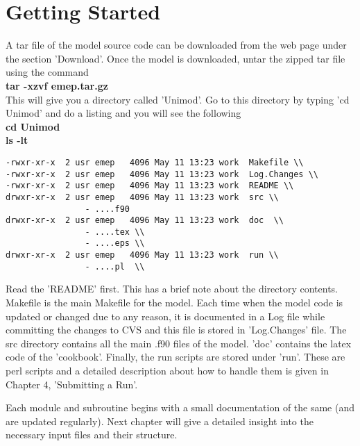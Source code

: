 \section{Getting Started}

A tar file of the model source code can be downloaded from the web
page under the section 'Download'.   Once the model is downloaded,
untar the zipped tar file using  the command \\

\textbf{tar -xzvf emep.tar.gz} \\

This will give you a directory called 'Unimod'.  Go to this directory
by typing 'cd Unimod' and do a listing and you will see the following
\\

\textbf{cd Unimod} \\
          \textbf{ls -lt}


\begin{verbatim}
-rwxr-xr-x  2 usr emep   4096 May 11 13:23 work  Makefile \\
-rwxr-xr-x  2 usr emep   4096 May 11 13:23 work  Log.Changes \\
-rwxr-xr-x  2 usr emep   4096 May 11 13:23 work  README \\
drwxr-xr-x  2 usr emep   4096 May 11 13:23 work  src \\
                - ....f90
drwxr-xr-x  2 usr emep   4096 May 11 13:23 work  doc  \\
                - ....tex \\
                - ....eps \\
drwxr-xr-x  2 usr emep   4096 May 11 13:23 work  run \\
                - ....pl  \\

\end{verbatim}

Read the 'README' first.  This has a brief note about the directory
contents.  Makefile is the main Makefile for the model.  Each time
when the model code is updated or changed due to any reason, it is
documented in a Log file while committing the changes to CVS and this
file is stored in 'Log.Changes' file.  The src directory contains all
the main .f90 files of the model. 'doc' contains the latex code of the
'cookbook'.  Finally, the run scripts are stored under 'run'.  These
are perl scripts and a detailed description about how to handle them
is given in Chapter 4, 'Submitting a Run'.  

Each module and subroutine begins with a small documentation of the
same (and are updated regularly). Next chapter will give a detailed
insight into the necessary input files and their structure.    




